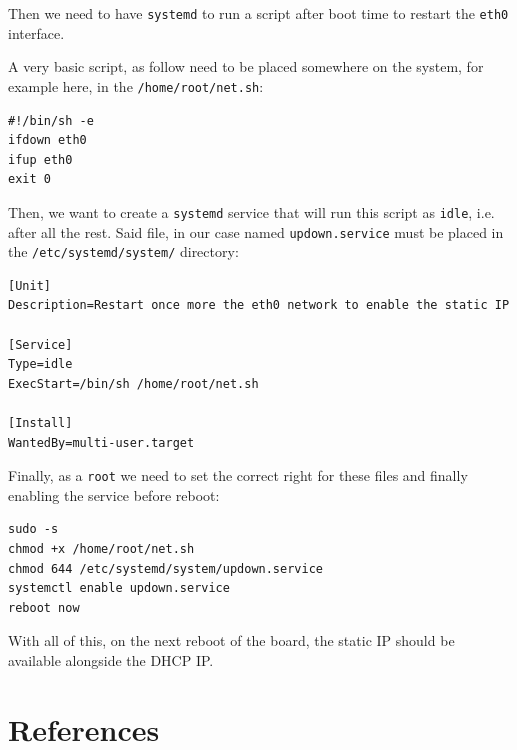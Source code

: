 \documentclass[10pt]{article}
\begin{document}
Then we need to have \texttt{systemd} to run a script after boot time to restart the \texttt{eth0} interface.

A very basic script, as follow need to be placed somewhere on the system, for example here, in the \texttt{/home/root/net.sh}:
\begin{verbatim}
#!/bin/sh -e
ifdown eth0
ifup eth0
exit 0
\end{verbatim}

Then, we want to create a \texttt{systemd} service that will run this script as \texttt{idle},
i.e. after all the rest. Said file, in our case named \texttt{updown.service} must be
placed in the \texttt{/etc/systemd/system/} directory:
\begin{verbatim}
[Unit]
Description=Restart once more the eth0 network to enable the static IP

[Service]
Type=idle
ExecStart=/bin/sh /home/root/net.sh

[Install]
WantedBy=multi-user.target
\end{verbatim}

Finally, as a \texttt{root} we need to set the correct right for these files and finally enabling the service before reboot:
\begin{verbatim}
sudo -s
chmod +x /home/root/net.sh
chmod 644 /etc/systemd/system/updown.service
systemctl enable updown.service
reboot now
\end{verbatim}

With all of this, on the next reboot of the board, the static IP should be available alongside the DHCP IP.

\section{References}
\label{sec:org83dc7b2}


\end{document}
